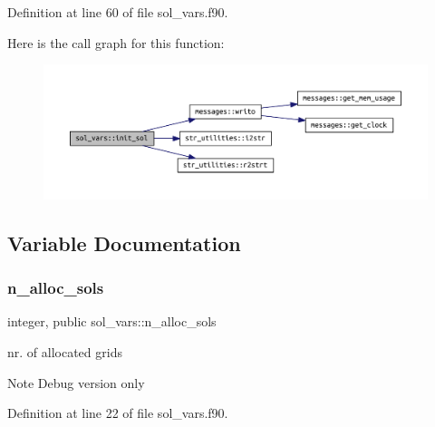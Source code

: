 Definition at line 60 of file sol\+\_\+vars.\+f90.

Here is the call graph for this function\+:\nopagebreak
\begin{figure}[H]
\begin{center}
\leavevmode
\includegraphics[width=350pt]{namespacesol__vars_a05d1378774a44f53c9643bdacc5bee4a_cgraph}
\end{center}
\end{figure}


\subsection{Variable Documentation}
\mbox{\label{namespacesol__vars_a91634d69ba45b896816f40e9013ddc79}} 
\subsubsection{\texorpdfstring{n\+\_\+alloc\+\_\+sols}{n\_alloc\_sols}}
{\footnotesize\ttfamily integer, public sol\+\_\+vars\+::n\+\_\+alloc\+\_\+sols}



nr. of allocated grids 

\begin{DoxyNote}{Note}
Debug version only 
\end{DoxyNote}


Definition at line 22 of file sol\+\_\+vars.\+f90.

